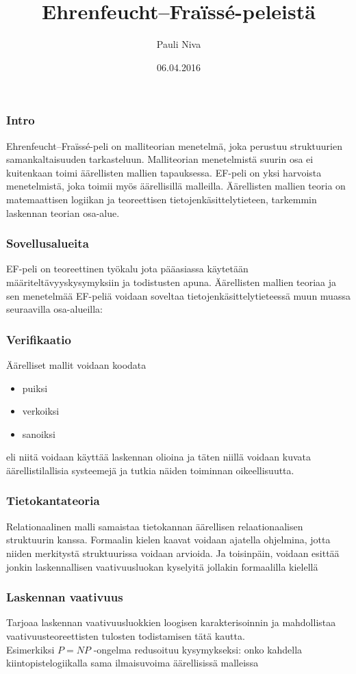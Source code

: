 \documentclass{beamer}
\title{Ehrenfeucht--Fraïssé-peleistä}
\author{Pauli Niva}
\date{06.04.2016}
\begin{document}
\frame{\titlepage}

\begin{frame}
\frametitle{Intro}
Ehrenfeucht--Fraïssé-peli on malliteorian menetelmä, joka perustuu struktuurien samankaltaisuuden tarkasteluun. \pause Malliteorian menetelmistä suurin osa ei kuitenkaan toimi äärellisten mallien tapauksessa. \pause EF-peli on yksi harvoista menetelmistä, joka toimii myös äärellisillä malleilla. \pause Äärellisten mallien teoria on matemaattisen logiikan ja teoreettisen tietojenkäsittelytieteen, tarkemmin laskennan teorian osa-alue.
\end{frame}

\begin{frame}
\frametitle{Sovellusalueita}
EF-peli on teoreettinen työkalu jota pääasiassa käytetään määriteltävyyskysymyksiin ja todistusten apuna.
Äärellisten mallien teoriaa ja sen menetelmää EF-peliä voidaan soveltaa tietojenkäsittelytieteessä muun muassa seuraavilla osa-alueilla:
\end{frame}

\begin{frame}
\frametitle{Verifikaatio}
Äärelliset mallit voidaan koodata
\begin{itemize}
\item<1-> puiksi
\item<2-> verkoiksi
\item<3-> sanoiksi
\end{itemize}
\pause \pause \pause
eli niitä voidaan käyttää laskennan olioina ja täten niillä voidaan kuvata äärellistilallisia systeemejä ja tutkia näiden toiminnan oikeellisuutta.
\end{frame}

\begin{frame}
\frametitle{Tietokantateoria}
Relationaalinen malli samaistaa tietokannan äärellisen relaationaalisen struktuurin kanssa.
\pause
Formaalin kielen kaavat voidaan ajatella ohjelmina, jotta niiden merkitystä struktuurissa voidaan arvioida.
\pause
Ja toisinpäin, voidaan esittää jonkin laskennallisen vaativuusluokan kyselyitä jollakin formaalilla kielellä
\end{frame}

\begin{frame}
\frametitle{Laskennan vaativuus}
Tarjoaa laskennan vaativuusluokkien loogisen karakterisoinnin ja mahdollistaa vaativuusteoreettisten tulosten todistamisen tätä kautta.
\pause
\\
Esimerkiksi $P = NP$ -ongelma redusoituu kysymykseksi: onko kahdella kiintopistelogiikalla sama ilmaisuvoima äärellisissä malleissa 
\end{frame}
\end{document}
